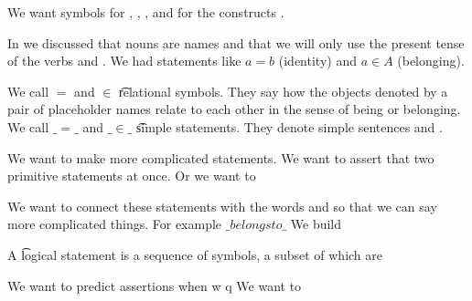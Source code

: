 

We want symbols for , , , and for the constructs .


In  we discussed that nouns are names and that we will only use the present tense of the verbs  and .
We had statements like ${a}={b}$ (identity) and $a \in A$ (belonging).

We call $=$ and $\in$ \t{relational symbols}.
They say how the objects denoted by a pair of placeholder names relate to each other in the sense of being or belonging.
We call $\_=\_$ and $\_\in\_$ \t{simple statements}.
They denote simple sentences  and .

We want to make more complicated statements.
We want to assert that two primitive statements at once.
Or we want to

We want to connect these statements with the words  and  so that we can say more complicated things.
For example $\_ belongs to \_$
We build

A \t{logical statement} is a sequence of symbols, a subset of which are

We want to predict assertions when  w q
We want to

\blankpage
